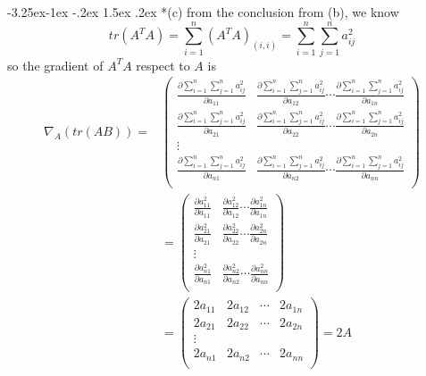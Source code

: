 \documentclass[12pt]{article}
\makeatletter
\renewcommand\subsection{\@startsection{subsection}{2}{\z@}%
	{-3.25ex\@plus -1ex \@minus -.2ex}%
	{1.5ex \@plus .2ex}%
	{\normalfont\large\bfseries}}%
\makeatother
\begin{document}
\subsection*{(c)}
from the conclusion from (b), we know
\begin{equation}\label{aa_ii}
	tr(A^TA)=\sum_{i=1}^n (A^TA)_{(i,i)}=\sum_{i=1}^n\sum_{j=1}^n a_{ij}^2
\end{equation}
so the gradient of $A^TA$ respect to $A$ is
\begin{equation}\label{trAA_grad}
\begin{split}
	\nabla_A(tr(AB))=&
	\left(  
	\begin{array}{cccc}
		\frac{\partial\sum_{i=1}^n\sum_{j=1}^n a_{ij}^2}{\partial a_{11}} & \frac{\partial\sum_{i=1}^n\sum_{j=1}^n a_{ij}^2}{\partial a_{12}} \cdots \frac{\partial\sum_{i=1}^n\sum_{j=1}^n a_{ij}^2}{\partial a_{1n}}\\
		\frac{\partial\sum_{i=1}^n\sum_{j=1}^n a_{ij}^2}{\partial a_{21}} & \frac{\partial\sum_{i=1}^n\sum_{j=1}^n a_{ij}^2}{\partial a_{22}} \cdots \frac{\partial\sum_{i=1}^n\sum_{j=1}^n a_{ij}^2}{\partial a_{2n}}\\
		\vdots \\
		\frac{\partial\sum_{i=1}^n\sum_{j=1}^n a_{ij}^2}{\partial a_{n1}} & \frac{\partial\sum_{i=1}^n\sum_{j=1}^n a_{ij}^2}{\partial a_{n2}} \cdots \frac{\partial\sum_{i=1}^n\sum_{j=1}^n a_{ij}^2}{\partial a_{nn}}\\	
	\end{array}
	\right)\\
	&=
	\left(  
	\begin{array}{cccc}
		\frac{\partial a_{11}^2}{\partial a_{11}} & \frac{\partial a_{12}^2}{\partial a_{12}} \cdots \frac{\partial a_{1n}^2}{\partial a_{1n}}\\
		\frac{\partial a_{21}^2}{\partial a_{21}} & \frac{\partial a_{22}^2}{\partial a_{22}} \cdots \frac{\partial a_{2n}^2}{\partial a_{2n}}\\
		\vdots \\
		\frac{\partial a_{n1}^2}{\partial a_{n1}} & \frac{\partial a_{n2}^2}{\partial a_{n2}} \cdots \frac{\partial a_{nn}^2}{\partial a_{nn}}\\	
	\end{array}
	\right)\\
	&=
	\left(
	\begin{array}{cccc}	
		2a_{11} & 2a_{12} & \cdots & 2a_{1n}\\
		2a_{21} & 2a_{22} & \cdots & 2a_{2n}\\
		\vdots \\
		2a_{n1} & 2a_{n2} & \cdots & 2a_{nn}\\
	\end{array}
	\right)
	=2A
\end{split}
\end{equation}
\end{document}
